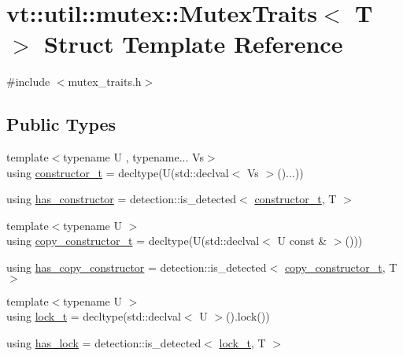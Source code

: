 \hypertarget{structvt_1_1util_1_1mutex_1_1_mutex_traits}{}\section{vt\+:\+:util\+:\+:mutex\+:\+:Mutex\+Traits$<$ T $>$ Struct Template Reference}
\label{structvt_1_1util_1_1mutex_1_1_mutex_traits}


{\ttfamily \#include $<$mutex\+\_\+traits.\+h$>$}

\subsection*{Public Types}
\begin{DoxyCompactItemize}
\item 
{\footnotesize template$<$typename U , typename... Vs$>$ }\\using \hyperlink{structvt_1_1util_1_1mutex_1_1_mutex_traits_a820317fa9aa30030a917301d5cd9d58d}{constructor\+\_\+t} = decltype(U(std\+::declval$<$ Vs $>$()...))
\item 
using \hyperlink{structvt_1_1util_1_1mutex_1_1_mutex_traits_a279a93dab689bf822085a35d3c1f32bc}{has\+\_\+constructor} = detection\+::is\+\_\+detected$<$ \hyperlink{structvt_1_1util_1_1mutex_1_1_mutex_traits_a820317fa9aa30030a917301d5cd9d58d}{constructor\+\_\+t}, T $>$
\item 
{\footnotesize template$<$typename U $>$ }\\using \hyperlink{structvt_1_1util_1_1mutex_1_1_mutex_traits_a300c2a638d97f9eb3c63ddd709e422a5}{copy\+\_\+constructor\+\_\+t} = decltype(U(std\+::declval$<$ U const  \& $>$()))
\item 
using \hyperlink{structvt_1_1util_1_1mutex_1_1_mutex_traits_abc2f711a1503efeeb8ab0659e5f8a560}{has\+\_\+copy\+\_\+constructor} = detection\+::is\+\_\+detected$<$ \hyperlink{structvt_1_1util_1_1mutex_1_1_mutex_traits_a300c2a638d97f9eb3c63ddd709e422a5}{copy\+\_\+constructor\+\_\+t}, T $>$
\item 
{\footnotesize template$<$typename U $>$ }\\using \hyperlink{structvt_1_1util_1_1mutex_1_1_mutex_traits_ab7d7468978f0094f267e7f11665fedeb}{lock\+\_\+t} = decltype(std\+::declval$<$ U $>$().lock())
\item 
using \hyperlink{structvt_1_1util_1_1mutex_1_1_mutex_traits_a9fda8e52286ca180edae0c3ba2a0ca5e}{has\+\_\+lock} = detection\+::is\+\_\+detected$<$ \hyperlink{structvt_1_1util_1_1mutex_1_1_mutex_traits_ab7d7468978f0094f267e7f11665fedeb}{lock\+\_\+t}, T $>$

\end{DoxyCompactItemize}
